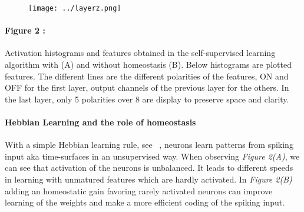 \documentclass[12pt]{article}
\newcommand{\citep}[1]{\parencite{#1}}
\begin{document}
\begin{figure}
\vspace{-20pt}
\texttt{[image: ../layerz.png]}
\vspace{-55pt}
\caption*
{
\label{fig:fig2}
}
\end{figure}

\paragraph*{Figure 2 : }
Activation histograms and features obtained in the self-supervised learning algorithm with (A) and without homeostasis (B). Below histograms are plotted features. The different lines are the different polarities of the features, ON and OFF for the first layer, output channels of the previous layer for the others. In the last layer, only 5 polarities over 8 are display to preserve space and clarity. 


\paragraph*{Hebbian Learning and the role of homeostasis}
With a simple Hebbian learning rule, see ~\citep{Lagorce17}, neurons learn patterns from spiking input aka time-surfaces in an unsupervised way.
When observing \textit{Figure 2(A)}, we can see that activation of the neurons is unbalanced. It leads to different speeds in learning with unmatured features which are hardly activated. 
In \textit{Figure 2(B)} adding an homeostatic gain favoring rarely activated neurons can improve learning of the weights and make a more efficient coding of the spiking input. 
%
\end{document}
